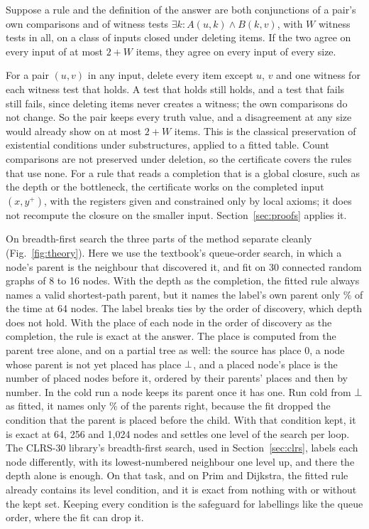 \begin{proposition}\label{prop:finite}
Suppose a rule and the definition of the answer are both conjunctions of a pair's own comparisons and of witness tests
$\exists k : A(u,k) \wedge B(k,v)$, with $W$ witness tests in all, on a class of inputs closed under deleting items.
If the two agree on every input of at most $2 + W$ items, they agree on every input of every size.
\end{proposition}

For a pair $(u,v)$ in any input, delete every item except $u$, $v$ and one witness for each witness test that holds. A
test that holds still holds, and a test that fails still fails, since deleting items never creates a witness; the own
comparisons do not change. So the pair keeps every truth value, and a disagreement at any size would already show on
at most $2 + W$ items. This is the classical preservation of existential conditions under substructures, applied to a fitted table. Count
comparisons are not preserved under deletion, so the certificate covers the rules that use none. For a rule that reads a
completion that is a global closure, such as the depth or the bottleneck, the certificate works on the completed input
$(x, y^{+})$, with the registers given and constrained only by local axioms; it does not recompute the closure on the
smaller input. Section~\ref{sec:proofs} applies it.

On breadth-first search the three parts of the method separate cleanly (Fig.~\ref{fig:theory}). Here we use the
textbook's queue-order search, in which a node's parent is the neighbour that discovered it, and fit on 30 connected
random graphs of 8 to 16 nodes. With the depth as the completion, the fitted rule always names a valid shortest-path
parent, but it names the label's own parent only \% of the time at 64 nodes. The label breaks ties by
the order of discovery, which depth does not hold. With the place of each node in the order of discovery as the
completion, the rule is exact at the answer. The place is computed from the parent tree alone, and on a partial tree as
well: the source has place 0, a node whose parent is not yet placed has place $\bot$, and a placed node's place is the
number of placed nodes before it, ordered by their parents' places and then by number. In the cold run a node keeps its
parent once it has one. Run cold from $\bot$ as fitted, it
names only \% of the parents right, because the fit dropped the condition that the parent is placed
before the child. With that condition kept, it is exact at 64, 256 and 1,024 nodes and settles one level of the search
per loop. The CLRS-30 library's breadth-first search, used in Section~\ref{sec:clrs}, labels each node differently, with
its lowest-numbered neighbour one level up, and there the depth alone is enough. On that task, and on Prim and Dijkstra,
the fitted rule already contains its level condition, and it is exact from nothing with or without the kept set. Keeping every condition is the safeguard for labellings
like the queue order, where the fit can drop it.

